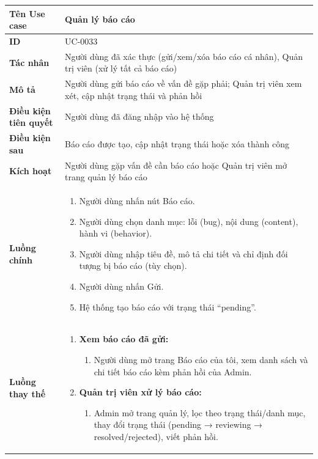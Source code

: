 {
\small
\renewcommand{\arraystretch}{1.15}

\begin{tabularx}{\textwidth}{|>{\raggedright\arraybackslash}p{3.5cm}|>{\raggedright\arraybackslash}X|}
\hline
\textbf{Tên Use case} & Quản lý báo cáo \\
\hline
\textbf{ID} & UC-0033 \\
\hline
\textbf{Tác nhân} & Người dùng đã xác thực (gửi/xem/xóa báo cáo cá nhân), Quản trị viên (xử lý tất cả báo cáo) \\
\hline
\textbf{Mô tả} & Người dùng gửi báo cáo về vấn đề gặp phải; Quản trị viên xem xét, cập nhật trạng thái và phản hồi \\
\hline
\textbf{Điều kiện tiên quyết} & Người dùng đã đăng nhập vào hệ thống \\
\hline
\textbf{Điều kiện sau} & Báo cáo được tạo, cập nhật trạng thái hoặc xóa thành công \\
\hline
\textbf{Kích hoạt} & Người dùng gặp vấn đề cần báo cáo hoặc Quản trị viên mở trang quản lý báo cáo \\
\hline
\textbf{Luồng chính} &
\begin{enumerate}
    \item Người dùng nhấn nút Báo cáo.
    \item Người dùng chọn danh mục: lỗi (bug), nội dung (content), hành vi (behavior).
    \item Người dùng nhập tiêu đề, mô tả chi tiết và chỉ định đối tượng bị báo cáo (tùy chọn).
    \item Người dùng nhấn Gửi.
    \item Hệ thống tạo báo cáo với trạng thái ``pending''.
\end{enumerate} \\
\hline
\textbf{Luồng thay thế} &
\begin{enumerate}
    \item \textbf{Xem báo cáo đã gửi:}
    \begin{enumerate}
        \item[1A.] Người dùng mở trang Báo cáo của tôi, xem danh sách và chi tiết báo cáo kèm phản hồi của Admin.
    \end{enumerate}
    \item \textbf{Quản trị viên xử lý báo cáo:}
    \begin{enumerate}
        \item[1B.] Admin mở trang quản lý, lọc theo trạng thái/danh mục, thay đổi trạng thái (pending → reviewing → resolved/rejected), viết phản hồi.

\end{enumerate}
\end{enumerate}
\end{tabularx}}

